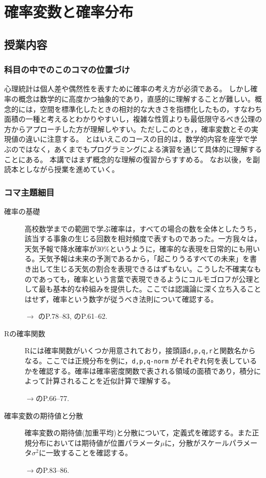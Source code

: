 \section{確率変数と確率分布}
\subsection{授業内容}
\subsubsection{科目の中でのこのコマの位置づけ}
心理統計は個人差や偶然性を表すために確率の考え方が必須である。
しかし確率の概念は数学的に高度かつ抽象的であり，直感的に理解することが難しい。概念的には，空間を標準化したときの相対的な大きさを指標化したもの，すなわち面積の一種と考えるとわかりやすいし，複雑な性質よりも最低限守るべき公理の方からアプローチした方が理解しやすい。ただしこのとき，，確率変数とその実現値の違いに注意する。
とはいえこのコースの目的は，数学的内容を座学で学ぶのではなく，あくまでもプログラミングによる演習を通じて具体的に理解することにある。
本講ではまず概念的な理解の復習からすすめる。
なお以後，\textcite{kosugi2023}を副読本としながら授業を進めていく。
\subsubsection{コマ主題細目}
\begin{description}
	\item[確率の基礎] 高校数学までの範囲で学ぶ確率は，すべての場合の数を全体としたうち，該当する事象の生じる回数を相対頻度で表すものであった。一方我々は，天気予報で降水確率が30\%というように，確率的な表現を日常的にも用いる。天気予報は未来の予測であるから，「起こりうるすべての未来」を書き出して生じる天気の割合を表現できるはずもない。こうした不確実なものであっても，確率という言葉で表現できるようにコルモゴロフが公理として最も基本的な枠組みを提供した。ここでは認識論に深く立ち入ることはせず，確率という数字が従うべき法則について確認する。
		\begin{flushright}
			$\to$ \textcite{Maeda2017}のP.78--83, \textcite{kosugi2023}のP.61--62.
		\end{flushright}
	\item[Rの確率関数] Rには確率関数がいくつか用意されており，接頭語\verb|d,p,q,r|と関数名からなる。ここでは正規分布を例に，\verb|d,p,q-norm| がそれぞれ何を表しているかを確認する。確率は確率密度関数で表される領域の面積であり，積分によって計算されることを近似計算で理解する。
		\begin{flushright}
			$\to$\textcite{kosugi2023}のP.66--77.
		\end{flushright}
	\item[確率変数の期待値と分散] 確率変数の期待値(加重平均)と分散について，定義式を確認する。また正規分布においては期待値が位置パラメータ$\mu$に，分散がスケールパラメータ$\sigma^2$に一致することを確認する。
		\begin{flushright}
			$\to$\textcite{kosugi2023}のP.83--86.
		\end{flushright}
\end{description}

